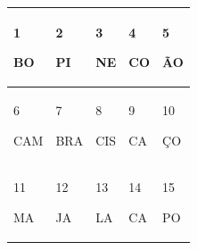 \begin{longtable}[]{@{}lllll@{}}
\toprule
\begin{minipage}[b]{0.19\columnwidth}\raggedright\strut
1

BO\strut
\end{minipage} & \begin{minipage}[b]{0.19\columnwidth}\raggedright\strut
2

PI\strut
\end{minipage} & \begin{minipage}[b]{0.19\columnwidth}\raggedright\strut
3

NE\strut
\end{minipage} & \begin{minipage}[b]{0.19\columnwidth}\raggedright\strut
4

CO\strut
\end{minipage} & \begin{minipage}[b]{0.19\columnwidth}\raggedright\strut
5

ÃO\strut
\end{minipage}\tabularnewline
\midrule
\endhead
\begin{minipage}[t]{0.19\columnwidth}\raggedright\strut
6

CAM\strut
\end{minipage} & \begin{minipage}[t]{0.19\columnwidth}\raggedright\strut
7

BRA\strut
\end{minipage} & \begin{minipage}[t]{0.19\columnwidth}\raggedright\strut
8

CIS\strut
\end{minipage} & \begin{minipage}[t]{0.19\columnwidth}\raggedright\strut
9

CA\strut
\end{minipage} & \begin{minipage}[t]{0.19\columnwidth}\raggedright\strut
10

ÇO\strut
\end{minipage}\tabularnewline
\midrule
\begin{minipage}[t]{0.19\columnwidth}\raggedright\strut
11

MA\strut
\end{minipage} & \begin{minipage}[t]{0.19\columnwidth}\raggedright\strut
12

JA\strut
\end{minipage} & \begin{minipage}[t]{0.19\columnwidth}\raggedright\strut
13

LA\strut
\end{minipage} & \begin{minipage}[t]{0.19\columnwidth}\raggedright\strut
14

CA\strut
\end{minipage} & \begin{minipage}[t]{0.19\columnwidth}\raggedright\strut
15

PO\strut
\end{minipage}\tabularnewline
\bottomrule
\end{longtable}

